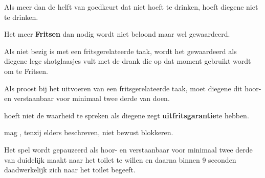 \vervolgLijst{}
\item \label{regel:niet_hoeven_drinken} Als meer dan de helft van \alleSpelers goedkeurt dat \eenSpeler niet hoeft te drinken, hoeft diegene niet te drinken.
\eindLijst{}

\vervolgLijst{}
\item Het meer \textbf{Fritsen} dan nodig wordt niet beloond maar wel gewaardeerd.
\eindLijst{}

\vervolgLijst{}
\item Als \eenSpeler niet bezig is met een fritsgerelateerde taak, wordt het gewaardeerd als diegene lege shotglaasjes vult met de drank die op dat moment gebruikt wordt om te Fritsen.
\eindLijst{}

\vervolgLijst{}
\item Als \eenSpeler proost bij het uitvoeren van een fritsgerelateerde taak, moet diegene dit hoor- en verstaanbaar voor minimaal twee derde van \alleSpelers doen.
\eindLijst{}

\vervolgLijst{}
\item \EenSpeler hoeft niet de waarheid te spreken als diegene zegt \textbf{uitfritsgarantie}\footnotemark[2] te hebben.
\eindLijst{}

\vervolgLijst{}
\item \EenSpeler mag \medeSpelersN, tenzij elders beschreven, niet bewust blokkeren.
\label{regel:speler_blokkeren}
\eindLijst{}


\newpage
{}


\vervolgLijst{}
\item Het spel wordt gepauzeerd als \eenSpeler hoor- en verstaanbaar voor minimaal twee derde van \alleSpelers duidelijk maakt naar het toilet te willen en daarna binnen 9 seconden daadwerkelijk zich naar het toilet begeeft.
\label{regel:stilleggen_1}
\eindLijst{}

